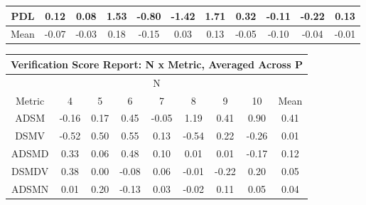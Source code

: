 \documentclass[11pt,a4paper]{report}
\begin{document}
\begin{longtable}{ | c || c | c | c | c | c | c | c | c | c || c |}
PDL &  \cellcolor[HTML]{FFFFFF} 0.12 &  \cellcolor[HTML]{FFFFFF} 0.08 &  \cellcolor[HTML]{D7D7FF} 1.53 &  \cellcolor[HTML]{FFE7E7} -0.80 &  \cellcolor[HTML]{FFDFDF} -1.42 &  \cellcolor[HTML]{D7D7FF} 1.71 &  \cellcolor[HTML]{F7F7FF} 0.32 &  \cellcolor[HTML]{FFFFFF} -0.11 &  \cellcolor[HTML]{FFF7F7} -0.22 &  \cellcolor[HTML]{FFFFFF} 0.13 \\
\hline
\hline
Mean  &  \cellcolor[HTML]{FFFFFF} -0.07 &  \cellcolor[HTML]{FFFFFF} -0.03 &  \cellcolor[HTML]{F7F7FF} 0.18 &  \cellcolor[HTML]{FFFFFF} -0.15 &  \cellcolor[HTML]{FFFFFF} 0.03 &  \cellcolor[HTML]{FFFFFF} 0.13 &  \cellcolor[HTML]{FFFFFF} -0.05 &  \cellcolor[HTML]{FFFFFF} -0.10 &  \cellcolor[HTML]{FFFFFF} -0.04 &  \cellcolor[HTML]{FFFFFF} -0.01 \\
\hline
\end{longtable}
\begin{longtable}{ | c || c | c | c | c | c | c | c || c |}
\hline
\multicolumn{9}{|c|}{ Verification Score Report: N x Metric, Averaged Across P } \\
\hline
\multicolumn{9}{|c|}{ N } \\
\hline
Metric & 4 & 5 & 6 & 7 & 8 & 9 & 10 & Mean\\
\hline
\hline
\endhead
ADSM &  \cellcolor[HTML]{FFF7F7} -0.16 &  \cellcolor[HTML]{F7F7FF} 0.17 &  \cellcolor[HTML]{F7F7FF} 0.45 &  \cellcolor[HTML]{FFFFFF} -0.05 &  \cellcolor[HTML]{DFDFFF} 1.19 &  \cellcolor[HTML]{F7F7FF} 0.41 &  \cellcolor[HTML]{E7E7FF} 0.90 &  \cellcolor[HTML]{F7F7FF} 0.41 \\
DSMV &  \cellcolor[HTML]{FFEFEF} -0.52 &  \cellcolor[HTML]{EFEFFF} 0.50 &  \cellcolor[HTML]{EFEFFF} 0.55 &  \cellcolor[HTML]{FFFFFF} 0.13 &  \cellcolor[HTML]{FFEFEF} -0.54 &  \cellcolor[HTML]{F7F7FF} 0.22 &  \cellcolor[HTML]{FFF7F7} -0.26 &  \cellcolor[HTML]{FFFFFF} 0.01 \\
ADSMD &  \cellcolor[HTML]{F7F7FF} 0.33 &  \cellcolor[HTML]{FFFFFF} 0.06 &  \cellcolor[HTML]{EFEFFF} 0.48 &  \cellcolor[HTML]{FFFFFF} 0.10 &  \cellcolor[HTML]{FFFFFF} 0.01 &  \cellcolor[HTML]{FFFFFF} 0.01 &  \cellcolor[HTML]{FFF7F7} -0.17 &  \cellcolor[HTML]{FFFFFF} 0.12 \\
DSMDV &  \cellcolor[HTML]{F7F7FF} 0.38 &  \cellcolor[HTML]{FFFFFF} 0.00 &  \cellcolor[HTML]{FFFFFF} -0.08 &  \cellcolor[HTML]{FFFFFF} 0.06 &  \cellcolor[HTML]{FFFFFF} -0.01 &  \cellcolor[HTML]{FFF7F7} -0.22 &  \cellcolor[HTML]{F7F7FF} 0.20 &  \cellcolor[HTML]{FFFFFF} 0.05 \\
ADSMN &  \cellcolor[HTML]{FFFFFF} 0.01 &  \cellcolor[HTML]{F7F7FF} 0.20 &  \cellcolor[HTML]{FFFFFF} -0.13 &  \cellcolor[HTML]{FFFFFF} 0.03 &  \cellcolor[HTML]{FFFFFF} -0.02 &  \cellcolor[HTML]{FFFFFF} 0.11 &  \cellcolor[HTML]{FFFFFF} 0.05 &  \cellcolor[HTML]{FFFFFF} 0.04 \\

\end{longtable}
\end{document}
